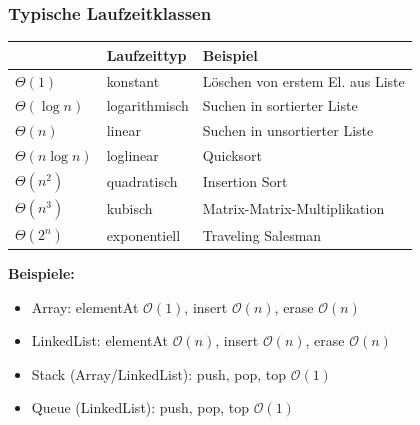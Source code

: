 \documentclass[fs, footer]{latex4ei}
\begin{document}
\begin{multicols*}{4}
\subsubsection{Typische Laufzeitklassen}
\begin{tabular}{l|l|l}
 & Laufzeittyp & Beispiel \\ \hline
$\Theta (1)$ & konstant & Löschen von erstem El. aus Liste\\
$\Theta (\log n)$ & logarithmisch & Suchen in sortierter Liste \\
$\Theta (n)$ & linear & Suchen in unsortierter Liste\\
$\Theta (n \log n)$ & loglinear & Quicksort\\
$\Theta (n^2)$ & quadratisch & Insertion Sort\\
$\Theta (n^3)$ & kubisch & Matrix-Matrix-Multiplikation\\
$\Theta (2^n)$ & exponentiell & Traveling Salesman\\
\end{tabular}
\textbf{Beispiele:}
\begin{itemize}
	\item Array: elementAt $\mathcal O(1)$, insert $\mathcal O(n)$, erase $\mathcal O(n)$
	\item LinkedList: elementAt $\mathcal O(n)$, insert $\mathcal O(n)$, erase $\mathcal O(n)$
	\item Stack (Array/LinkedList): push, pop, top $\mathcal O(1)$
	\item Queue (LinkedList): push, pop, top $\mathcal O(1)$
\end{itemize}

\end{multicols*}
\end{document}
